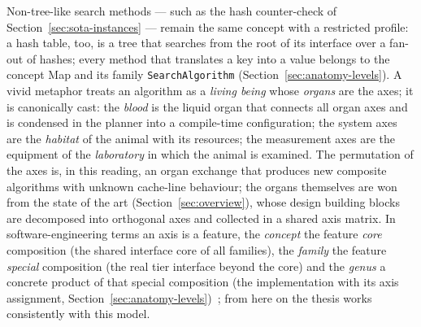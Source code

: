 \begin{nurkurz}
Non-tree-like search methods --- such as the hash counter-check of Section~\ref{sec:sota-instances} ---
remain the same concept with a restricted profile: a hash table, too, is a tree that searches from the root
of its interface over a fan-out of hashes; every method that translates a key into a value belongs to the
concept Map and its family \texttt{SearchAlgorithm} (Section~\ref{sec:anatomy-levels}). A vivid metaphor
treats an algorithm as a \emph{living being} whose \emph{organs} are the axes; it is canonically cast: the
\emph{blood} is the liquid organ that connects all organ axes and is condensed in the planner into a
compile-time configuration; the system axes are the \emph{habitat} of the animal with its resources; the
measurement axes are the equipment of the \emph{laboratory} in which the animal is examined. The
permutation of the axes is, in this reading, an organ exchange that produces new composite algorithms
with unknown cache-line behaviour; the organs themselves are won from the state of the art
(Section~\ref{sec:overview}), whose design building blocks are decomposed into orthogonal axes and
collected in a shared axis matrix. In software-engineering terms an axis is a feature, the \emph{concept}
the feature \emph{core} composition (the shared interface core of all families), the \emph{family} the
feature \emph{special} composition (the real tier interface beyond the core) and the \emph{genus} a
concrete product of that special composition (the implementation with its axis assignment,
Section~\ref{sec:anatomy-levels})~\cite{apel2013feature,batory1992hierarchical}; from here on the thesis
works consistently with this model.
\end{nurkurz}

